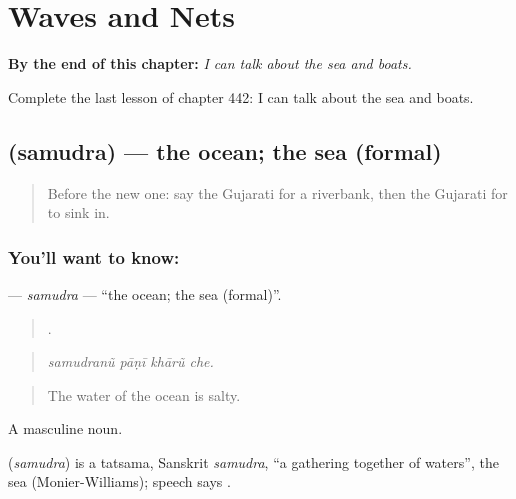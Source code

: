 
\chapter{Waves and Nets}
\label{ch:gu-waves-and-nets}

\begin{chapteropening}
\textbf{By the end of this chapter:} \emph{I can talk about the sea and boats.}

Complete the last lesson of chapter 442: I can talk about the sea and boats.
\end{chapteropening}

\section[\texorpdfstring{\gu{સમુદ્ર} (samudra)}{સમુદ્ર (samudra)}]{ (samudra) — the ocean; the sea (formal)}

\label{lesson:GU-C442-samudra}



\begin{quote}
Before the new one: say the Gujarati for a riverbank, then the Gujarati for to sink in.
\end{quote}

\subsection*{You'll want to know: }
\textbf{} — \emph{samudra} — \textquotedblleft{}the ocean; the sea (formal)\textquotedblright{}.

\begin{quote}
   .
\end{quote}

\begin{quote}
\emph{samudranũ pāṇī khārũ che.}
\end{quote}

\begin{quote}
The water of the ocean is salty.
\end{quote}

A masculine noun.

\begin{cousinweb}
\textbf{} (\emph{samudra}) is a tatsama, Sanskrit \emph{samudra}, \textquotedblleft{}a gathering together of waters\textquotedblright{}, the sea (Monier-Williams); speech says .
\end{cousinweb}

